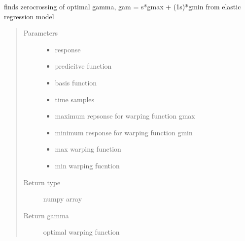 \documentclass[letterpaper,10pt,english]{sphinxmanual}
\begin{document}

\begin{fulllineitems}
\label{\detokenize{utility_functions:utility_functions.zero_crossing}}
finds zero\sphinxhyphen{}crossing of optimal gamma, gam = s*gmax + (1\sphinxhyphen{}s)*gmin
from elastic regression model
\begin{quote}\begin{description}
\item[{Parameters}] \leavevmode\begin{itemize}
\item {} 
 \textendash{} response

\item {} 
 \textendash{} predicitve function

\item {} 
 \textendash{} basis function

\item {} 
 \textendash{} time samples

\item {} 
 \textendash{} maximum repsonse for warping function gmax

\item {} 
 \textendash{} minimum response for warping function gmin

\item {} 
 \textendash{} max warping function

\item {} 
 \textendash{} min warping fucntion

\end{itemize}

\item[{Return type}] \leavevmode
numpy array

\item[{Return gamma}] \leavevmode
optimal warping function

\end{description}\end{quote}

\end{fulllineitems}
\end{document}
